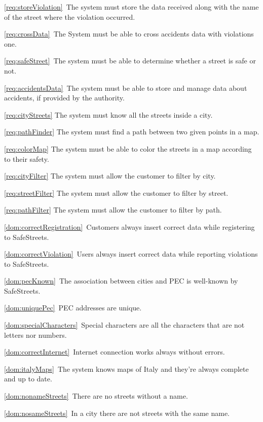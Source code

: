 \begin{description}
\begin{description}
					\item \ref{req:storeViolation}\ The system must store the data received along with the name of the street where the violation occurred.
					\item \ref{req:crossData}\ The System must be able to cross accidents data with violations one.
					\item \ref{req:safeStreet}\ The system must be able to determine whether a street is safe or not.
					\item \ref{req:accidentsData}\ The system must be able to store and manage data about accidents, if provided by the authority.
					\item \ref{req:cityStreets} The system must know all the streets inside a city.
					\item \ref{req:pathFinder} The system must find a path between two given points in a map.
					\item \ref{req:colorMap} The system must be able to color the streets in a map according to their safety.
					\item \ref{req:cityFilter} The system must allow the customer to filter by city.
					\item \ref{req:streetFilter} The system must allow the customer to filter by street.
					\item \ref{req:pathFilter} The system must allow the customer to filter by path.
					\item \ref{dom:correctRegistration}\ Customers always insert correct data while registering to SafeStreets.
					\item \ref{dom:correctViolation}\ Users always insert correct data while reporting violations to SafeStreets.
					\item \ref{dom:pecKnown}\ The association between cities and PEC is well-known by SafeStreets.
					\item \ref{dom:uniquePec}\ PEC addresses are unique.
					\item \ref{dom:specialCharacters}\ Special characters are all the characters that are not letters nor numbers.
					\item \ref{dom:correctInternet}\ Internet connection works always without errors.
					\item \ref{dom:italyMaps}\ The system knows maps of Italy and they’re always complete and up to date.
					\item \ref{dom:nonameStreets}\ There are no streets without a name.
					\item \ref{dom:nosameStreets}\ In a city there are not streets with the same name.

\end{description}
\end{description}
